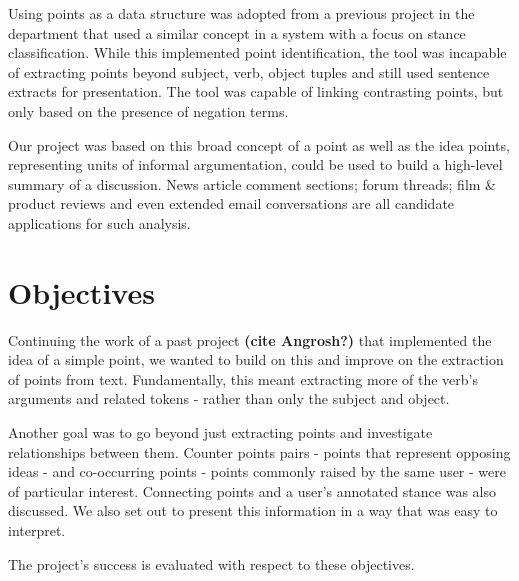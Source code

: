     Using points as a data structure was adopted from a previous project in the department that used a similar concept in a system with a focus on stance classification. While this implemented point identification, the tool was incapable of extracting points beyond subject, verb, object tuples and still used sentence extracts for presentation. The tool was capable of linking contrasting points, but only based on the presence of negation terms.

    Our project was based on this broad concept of a point as well as the idea points, representing units of informal argumentation, could be used to build a high-level summary of a discussion. News article comment sections; forum threads; film \& product reviews and even extended email conversations are all candidate applications for such analysis.

  \section{Objectives}
    Continuing the work of a past project \textbf{(cite Angrosh?)} that implemented the idea of a simple point, we wanted to build on this and improve on the extraction of points from text. Fundamentally, this meant extracting more of the verb's arguments and related tokens - rather than only the subject and object.

    Another goal was to go beyond just extracting points and investigate relationships between them. Counter points pairs - points that represent opposing ideas - and co-occurring points - points commonly raised by the same user - were of particular interest. Connecting points and a user's annotated stance was also discussed. We also set out to present this information in a way that was easy to interpret.

    The project's success is evaluated with respect to these objectives.
